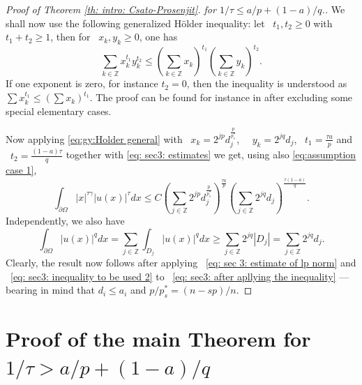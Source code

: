 \documentclass[reqno,12pt]{amsart}
\numberwithin{equation}{section}
\theoremstyle{plain}
\theoremstyle{definition}
\renewcommand{\leq}{\leqslant}
\renewcommand{\geq}{\geqslant}
\begin{document}
\begin{proof}[Proof of Theorem \ref{th: intro: Csato-Prosenjit}. for $1/\tau\leq a/p+(1-a)/q$.]
We shall now use the following generalized H\"older inequality: 
let ~$t_1, t_2 \geq 0$ with ~$t_1 + t_2 \geq 1$, then for ~$x_k, y_k \geq 0$, one has 
    \begin{equation}
    \label{eq:gy:Holder general}
    \sum_{k\in \mathbb{Z}}x_k^{t_1}y_k^{t_2} \leq \left( \sum_{k\in \mathbb{Z}} x_k\right)^{t_1}\left( \sum_{k\in \mathbb{Z}}y_k \right)^{t_2}.
    \end{equation}
If one exponent is zero, for instance $t_2=0$, then the inequality is understood as $\sum x_k^{t_1}\leq (\sum x_k)^{t_1}$. The proof can be found for instance in \cite[Theorems 11, 22, and 167]{Hardy} after excluding some special elementary cases.

Now applying \eqref{eq:gy:Holder general} with ~$x_k = 2^{jp}d_j^{\frac{p}{p_s^*}}$, ~~$y_k =2^{jq}d_j$, ~$t_1 = \frac{\tau a}{p}$ and ~$t_2= \frac{(1-a)\tau}{q}$ together with \eqref{eq: sec3: estimates} we get, using also \eqref{eq:assumption case 1},
\begin{equation}
    \label{eq: sec3: after apllying the inequality}
      \int_{\partial \Omega} |x|^{\tau\gamma}|u(x)|^{\tau}dx 
      \leq  C \left(\sum_{j\in \mathbb{Z}} 2^{jp}d_j^{\frac{p}{p_s^*}}\right)^{\frac{\tau a}{p}} \left(\sum_{j\in \mathbb{Z}}2^{jq}d_j\right)^{\frac{\tau (1-a)}{q}}.
\end{equation}
Independently, we also have 
\begin{equation}
    \label{eq: sec 3: estimate of lp norm}
    \int_{\partial \Omega} |u(x)|^qdx  = \sum_{j \in\mathbb{Z} } \int_{D_j}|u(x)|^{q}dx \geq  \sum_{j \in\mathbb{Z}} 2^{jq} |D_j| = \sum_{j \in\mathbb{Z}} 2^{jq} d_j.
\end{equation}
Clearly, the result  now follows after applying ~\eqref{eq: sec 3: estimate of lp norm} and ~\eqref{eq: sec3: inequality to be used 2} to ~\eqref{eq: sec3: after apllying the inequality} ---bearing in mind that $d_i\leq a_i$ and $p/p_s^*=(n-sp)/n$.

\end{proof}

















\section{Proof of the main Theorem for $1/\tau>a/p+(1-a)/q$ }
\end{document}
